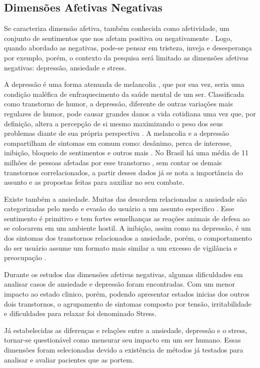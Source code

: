 \subsection{Dimensões Afetivas Negativas}
Se caracteriza dimensão afetiva, também conhecida como afetividade, um conjunto de sentimentos que nos afetam positiva ou negativamente \cite{pinto2009afetos}. Logo, quando abordado as negativas, pode-se pensar em tristeza, inveja e desesperança por exemplo, porém, o contexto da pesquisa será limitado as dimensões afetivas negativas: depressão, ansiedade e stress.

A depressão é uma forma atenuada de melancolia \cite{roudinesco2000psicanalise}, que por sua vez, seria uma condição maléfica de enfraquecimento da saúde mental de um ser. Classificada como transtorno de humor, a depressão, diferente de outras variações mais regulares de humor, pode causar grandes danos a vida cotidiana uma vez que, por definição, altera a percepção de si mesmo maximizando o peso dos seus problemas diante de sua própria perspectiva \cite{esteves2006depressao}. A melancolia e a depressão compartilham de sintomas em comum como: desânimo, perca de interesse, inibição, bloqueio de sentimentos e outros mais \cite[28]{freud2014livro}. No Brasil há uma média de 11 milhões de pessoas afetadas por esse transtorno \cite{paho2017-letstalk}, sem contar os demais transtornos correlacionados, a partir desses dados já se nota a importância do assunto e as propostas feitas para auxiliar no seu combate.

Existe também a ansiedade. Muitas das desordem relacionadas a ansiedade são categorizadas pelo medo e evasão do usuário a um assunto especifico \cite[393]{dsmiv}. Esse sentimento é primitivo e tem fortes semelhanças as reações animais de defesa ao se colocarem em um ambiente hostil. A inibição, assim como na depressão, é um dos sintomas dos transtornos relacionados a ansiedade, porém, o comportamento do ser usuário assume um formato mais similar a um excesso de vigilância e preocupação \cite{margis2003relaccao}.

Durante os estudos das dimensões afetivas negativas, algumas dificuldades em analisar casos de ansiedade e depressão foram encontradas. Com um menor impacto ao estado clinico, porém, podendo apresentar estados inicias dos outros dois transtornos, o agrupamento de sintomas composto por tensão, irritabilidade e dificuldades para relaxar foi denominado Stress. \cite{lovibond1995structure, ribeiro2004contribuiccao, margis2003relaccao}

Já estabelecidas as diferenças e relações entre a ansiedade, depressão e o stress, tornar-se questionável como mensurar seu impacto em um ser humano. Essas dimensões foram selecionadas devido a existência de métodos já testados para analisar e avaliar pacientes que as portem.



